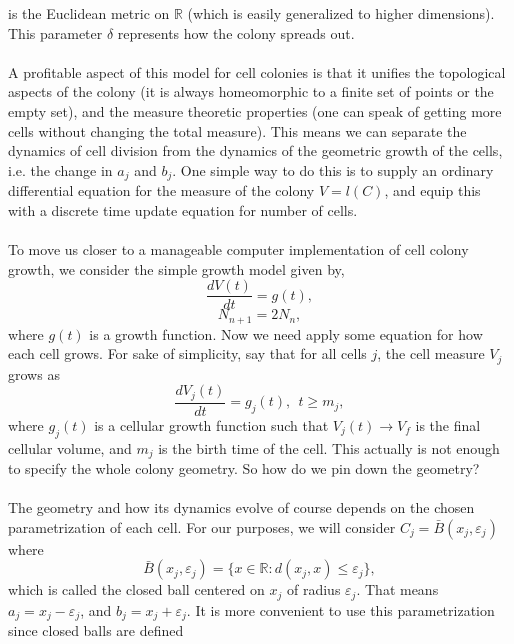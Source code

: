 is the Euclidean metric on $\mathbb{R}$ (which is easily generalized to 
higher dimensions). This parameter $\delta$ represents how the colony spreads out.
\\
\\
A profitable aspect of this model for cell colonies is that it unifies 
the topological aspects of the colony (it is always homeomorphic to a finite 
set of points or the empty set), and the measure theoretic properties (one can 
speak of getting more cells without changing the total measure). This means we 
can separate the dynamics of cell division from the dynamics of the geometric 
growth of the cells, i.e. the change in $a_j$ and $b_j$. One simple way to do 
this is to supply an ordinary differential equation for the measure of the 
colony $V = l(C)$, and equip this with a discrete time update equation for number of cells. 
\\
\\
To move us closer to a manageable computer implementation of cell colony growth, 
we consider the simple growth model given by,
\begin{equation*}
    \frac{dV(t)}{dt} = g(t),
\end{equation*}
\begin{equation*}
    N_{n+1} = 2N_n,
\end{equation*}
where $g(t)$ is a growth function. Now we need apply some equation for 
how each cell grows. For sake of simplicity, say that for all cells $j$, the cell measure $V_j$ grows as
\begin{equation*}
    \frac{dV_j(t)}{dt} = g_j(t), \ \ t \geq m_j,
\end{equation*}
 where $g_j(t)$ is a cellular growth function such that 
 $V_j(t) \rightarrow V_f$ is the final cellular volume, and $m_j$ is the 
 birth time of the cell. This actually is not enough to specify the whole 
 colony geometry. So how do we pin down the geometry?
\\
\\
The geometry and how its dynamics evolve of course depends on the 
chosen parametrization of each cell. For our purposes, we will 
consider $C_j = \bar{B} (x_j, \varepsilon_j)$ where
\begin{equation*}
    \bar{B} (x_j, \varepsilon_j) = \{ x \in \mathbb{R} : d(x_j,x) \leq \varepsilon_j \},
\end{equation*} 
which is called the closed ball centered on $x_j$ of radius $\varepsilon_j$.
 That means $a_j = x_j-\varepsilon_j$, and $b_j = x_j+\varepsilon_j$. It is 
 more convenient to use this parametrization since closed balls are defined 
